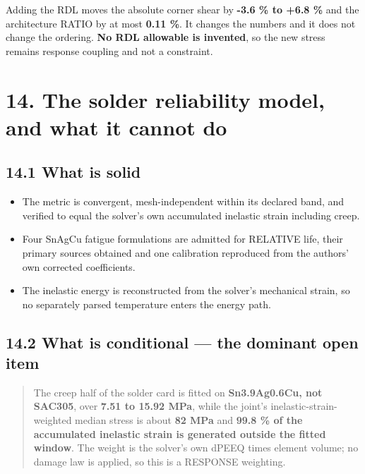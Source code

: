 \documentclass[10pt,]{article}
\providecommand{\tightlist}{%
  \setlength{\itemsep}{0pt}\setlength{\parskip}{0pt}}
\begin{document}
Adding the RDL moves the absolute corner shear by \textbf{-3.6 \% to
+6.8 \%} and the architecture RATIO by at most \textbf{0.11 \%}. It
changes the numbers and it does not change the ordering. \textbf{No RDL
allowable is invented}, so the new stress remains response coupling and
not a constraint.

\newpage

\hypertarget{the-solder-reliability-model-and-what-it-cannot-do}{%
\section{14. The solder reliability model, and what it cannot
do}\label{the-solder-reliability-model-and-what-it-cannot-do}}

\hypertarget{what-is-solid}{%
\subsection{14.1 What is solid}\label{what-is-solid}}

\begin{itemize}
\tightlist
\item
  The metric is convergent, mesh-independent within its declared band,
  and verified to equal the solver's own accumulated inelastic strain
  including creep.
\item
  Four SnAgCu fatigue formulations are admitted for RELATIVE life, their
  primary sources obtained and one calibration reproduced from the
  authors' own corrected coefficients.
\item
  The inelastic energy is reconstructed from the solver's mechanical
  strain, so no separately parsed temperature enters the energy path.
\end{itemize}

\hypertarget{what-is-conditional-the-dominant-open-item}{%
\subsection{14.2 What is conditional --- the dominant open
item}\label{what-is-conditional-the-dominant-open-item}}

\begin{quote}
The creep half of the solder card is fitted on \textbf{Sn3.9Ag0.6Cu, not
SAC305}, over \textbf{7.51 to 15.92 MPa}, while the joint's
inelastic-strain-weighted median stress is about \textbf{82 MPa} and
\textbf{99.8 \% of the accumulated inelastic strain is generated outside
the fitted window}. The weight is the solver's own dPEEQ times element
volume; no damage law is applied, so this is a RESPONSE weighting.
\end{quote}
\end{document}
